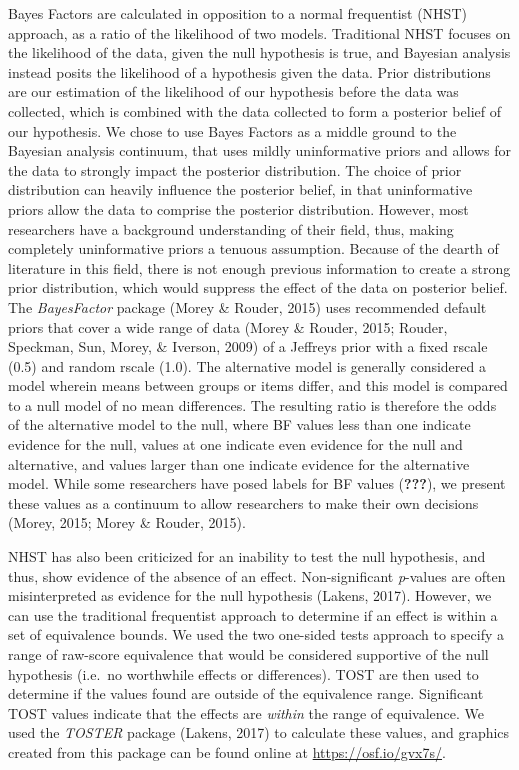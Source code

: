 \documentclass[english,man, mask]{apa6}
\theoremstyle{definition}
\theoremstyle{definition}
\theoremstyle{definition}
\theoremstyle{remark}
\begin{document}
Bayes Factors are calculated in opposition to a normal frequentist
(NHST) approach, as a ratio of the likelihood of two models. Traditional
NHST focuses on the likelihood of the data, given the null hypothesis is
true, and Bayesian analysis instead posits the likelihood of a
hypothesis given the data. Prior distributions are our estimation of the
likelihood of our hypothesis before the data was collected, which is
combined with the data collected to form a posterior belief of our
hypothesis. We chose to use Bayes Factors as a middle ground to the
Bayesian analysis continuum, that uses mildly uninformative priors and
allows for the data to strongly impact the posterior distribution. The
choice of prior distribution can heavily influence the posterior belief,
in that uninformative priors allow the data to comprise the posterior
distribution. However, most researchers have a background understanding
of their field, thus, making completely uninformative priors a tenuous
assumption. Because of the dearth of literature in this field, there is
not enough previous information to create a strong prior distribution,
which would suppress the effect of the data on posterior belief. The
\emph{BayesFactor} package (Morey \& Rouder, 2015) uses recommended
default priors that cover a wide range of data (Morey \& Rouder, 2015;
Rouder, Speckman, Sun, Morey, \& Iverson, 2009) of a Jeffreys prior with
a fixed rscale (0.5) and random rscale (1.0). The alternative model is
generally considered a model wherein means between groups or items
differ, and this model is compared to a null model of no mean
differences. The resulting ratio is therefore the odds of the
alternative model to the null, where BF values less than one indicate
evidence for the null, values at one indicate even evidence for the null
and alternative, and values larger than one indicate evidence for the
alternative model. While some researchers have posed labels for BF
values ({\textbf{???}}), we present these values as a continuum to allow
researchers to make their own decisions (Morey, 2015; Morey \& Rouder,
2015).

NHST has also been criticized for an inability to test the null
hypothesis, and thus, show evidence of the absence of an effect.
Non-significant \emph{p}-values are often misinterpreted as evidence for
the null hypothesis (Lakens, 2017). However, we can use the traditional
frequentist approach to determine if an effect is within a set of
equivalence bounds. We used the two one-sided tests approach to specify
a range of raw-score equivalence that would be considered supportive of
the null hypothesis (i.e.~no worthwhile effects or differences). TOST
are then used to determine if the values found are outside of the
equivalence range. Significant TOST values indicate that the effects are
\emph{within} the range of equivalence. We used the \emph{TOSTER}
package (Lakens, 2017) to calculate these values, and graphics created
from this package can be found online at \url{https://osf.io/gvx7s/}.
\end{document}
